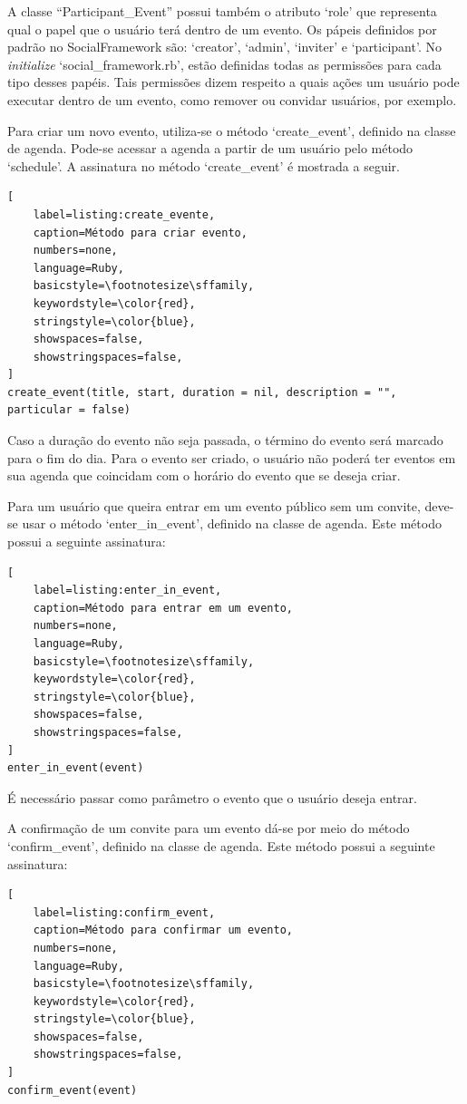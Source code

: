 A classe ``Participant\_Event'' possui também o atributo `role' que representa qual o papel que o usuário terá dentro de um evento. Os pápeis definidos por padrão no SocialFramework são: `creator', `admin', `inviter' e `participant'. No \textit{initialize} `social\_framework.rb', estão definidas todas as permissões para cada tipo desses papéis. Tais permissões dizem respeito a quais ações um usuário pode executar dentro de um evento, como remover ou convidar usuários, por exemplo.

Para criar um novo evento, utiliza-se o método `create\_event', definido na classe de agenda. Pode-se acessar a agenda a partir de um usuário pelo método `schedule'. A assinatura no método `create\_event' é mostrada a seguir.

\begin{lstlisting}[
    label=listing:create_evente,
    caption=Método para criar evento,
    numbers=none,
    language=Ruby,
    basicstyle=\footnotesize\sffamily,
    keywordstyle=\color{red},
    stringstyle=\color{blue},
    showspaces=false,
    showstringspaces=false,
]
create_event(title, start, duration = nil, description = "", particular = false)
\end{lstlisting}

Caso a duração do evento não seja passada, o término do evento será marcado para o fim do dia.
Para o evento ser criado, o usuário não poderá ter eventos em sua agenda que coincidam com o horário do evento que se deseja criar.

Para um usuário que queira entrar em um evento público sem um convite, deve-se usar o método `enter\_in\_event', definido na classe de agenda. Este método possui a seguinte assinatura:

\begin{lstlisting}[
    label=listing:enter_in_event,
    caption=Método para entrar em um evento,
    numbers=none,
    language=Ruby,
    basicstyle=\footnotesize\sffamily,
    keywordstyle=\color{red},
    stringstyle=\color{blue},
    showspaces=false,
    showstringspaces=false,
]
enter_in_event(event)
\end{lstlisting}

É necessário passar como parâmetro o evento que o usuário deseja entrar.

A confirmação de um convite para um evento dá-se por meio do método `confirm\_event', definido na classe de agenda. Este método possui a seguinte assinatura:

\begin{lstlisting}[
    label=listing:confirm_event,
    caption=Método para confirmar um evento,
    numbers=none,
    language=Ruby,
    basicstyle=\footnotesize\sffamily,
    keywordstyle=\color{red},
    stringstyle=\color{blue},
    showspaces=false,
    showstringspaces=false,
]
confirm_event(event)
\end{lstlisting}

